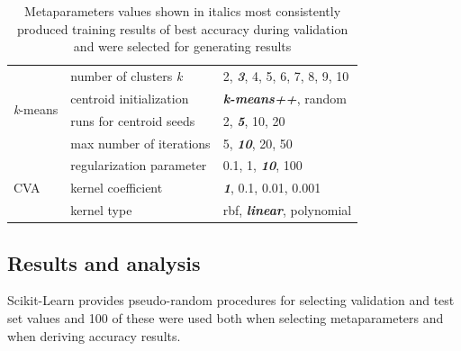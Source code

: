 \documentclass[12pt]{article}
\begin{document}
\begin{table}
\begin{center}
\begin{tabular}{l|l|l}
  \hline
  \multirow{4}{*}{\textit{k}-means} & number of clusters \textit{k}  & 2, \textit{\textbf{3}}, 4, 5, 6, 7, 8, 9, 10 \\
                                    & centroid initialization         & \textit{\textbf{k-means++}}, random \\
                                    & runs for centroid seeds	     & 2, \textit{\textbf{5}}, 10, 20 \\
                                    & max number of iterations           & 5, \textit{\textbf{10}}, 20, 50 \\
  \hline
    \multirow{3}{*}{CVA}            & regularization parameter  & 0.1, 1, \textit{\textbf{10}}, 100 \\
                                    & kernel coefficient      & \textit{\textbf{1}}, 0.1, 0.01, 0.001 \\
                                    & kernel type                  & rbf, \textit{\textbf{linear}}, polynomial \\
  \hline
  \end{tabular}
  \vspace{-2\baselineskip} %
  \end{center} 
  \caption{\centering\linespread{0.8}\selectfont Metaparameters values shown in italics most consistently produced training results of 
  best accuracy during validation and were selected for generating results}
  \vspace{-1\baselineskip} %
  \label{tab:metaparameters}
\end{table} 
\subsection*{Results and analysis}
Scikit-Learn provides pseudo-random procedures for selecting validation and test set values and 100 of these were used 
both when selecting metaparameters and when deriving accuracy results.
\end{document}
